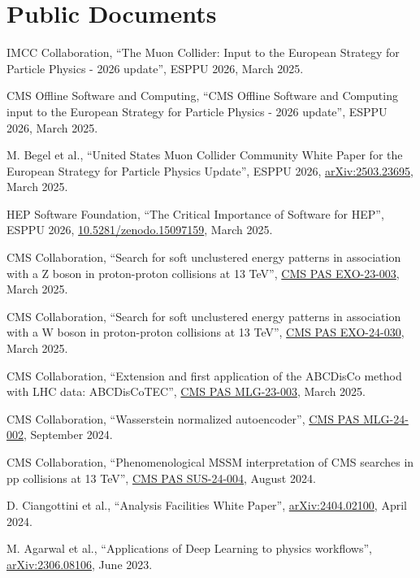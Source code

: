 \section{Public Documents}
\begin{description}[leftmargin=12pt,font=\normalfont,labelsep=0em]
\item IMCC Collaboration, ``The Muon Collider: Input to the European Strategy for Particle Physics - 2026 update'', ESPPU 2026, March 2025.
\item CMS Offline Software and Computing, ``CMS Offline Software and Computing input to the European Strategy for Particle Physics - 2026 update'', ESPPU 2026, March 2025.
\item M. Begel et al., ``United States Muon Collider Community White Paper for the European Strategy for Particle Physics Update'', ESPPU 2026, \href{https://arxiv.org/abs/2503.23695}{arXiv:2503.23695}, March 2025. %
\item HEP Software Foundation, ``The Critical Importance of Software for HEP'', ESPPU 2026, \href{https://doi.org/10.5281/zenodo.15097159}{10.5281/zenodo.15097159}, March 2025.
\item CMS Collaboration, ``Search for soft unclustered energy patterns in association with a Z boson in proton-proton collisions at 13 TeV'', \href{https://cds.cern.ch/record/2928077}{CMS PAS EXO-23-003}, March 2025.
\item CMS Collaboration, ``Search for soft unclustered energy patterns in association with a W boson in proton-proton collisions at 13 TeV'', \href{https://cds.cern.ch/record/2927983}{CMS PAS EXO-24-030}, March 2025.
\item CMS Collaboration, ``Extension and first application of the ABCDisCo method with LHC data: ABCDisCoTEC'', \href{https://cds.cern.ch/record/2927991}{CMS PAS MLG-23-003}, March 2025.
\item CMS Collaboration, ``Wasserstein normalized autoencoder'', \href{http://cds.cern.ch/record/2911111}{CMS PAS MLG-24-002}, September 2024. %
\item CMS Collaboration, ``Phenomenological MSSM interpretation of CMS searches in pp collisions at 13 TeV'', \href{http://cds.cern.ch/record/2906621}{CMS PAS SUS-24-004}, August 2024. %
\item D. Ciangottini et al., ``Analysis Facilities White Paper'', \href{https://arxiv.org/abs/2404.02100}{arXiv:2404.02100}, April 2024. %
\item M. Agarwal et al., ``Applications of Deep Learning to physics workflows'', \href{https://arxiv.org/abs/2306.08106}{arXiv:2306.08106}, June 2023. %

\end{description}
